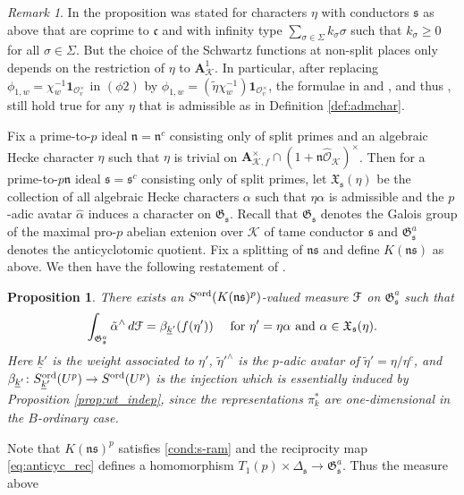 \documentclass[leqno]{amsart}
\newtheorem{prop}[thm]{Proposition}
\theoremstyle{definition}
\theoremstyle{remark}
\newtheorem{rem}[thm]{Remark}
\newcommand{\id}{\mathbf{1}}
\newcommand{\oo}{\mathcal{O}}
\newcommand{\A}{\mathbf A}
\newcommand{\fc}{\mathfrak{c}}
\newcommand{\fn}{\mathfrak{n}}
\newcommand{\fs}{\mathfrak{s}}
\newcommand{\K}{{\mathcal{K}}} %
\newcommand{\fG}{\mathfrak{G}}
\newcommand{\fX}{\mathfrak{X}}
\newcommand{\wt}[1]{\underline{ #1 }}
\newcommand{\euF}{\EuScript{F}} %
\newcommand{\ord}{\textnormal{ord}} %
\begin{document}
\begin{rem}
In \cite{lee}
the proposition was stated 
for characters $\eta$
with conductors $\fs$ as above
that are coprime to $\fc$
and with infinity type
$\sum_{\sigma\in \Sigma}k_\sigma\sigma$
such that $k_\sigma\geq 0$ for all $\sigma\in \Sigma$.
But the choice of the Schwartz functions
at non-split places only depends
on the restriction of $\eta$ to $\A_\K^1$.
In particular, after replacing 
$\phi_{1,w}=\chi_w^{-1}\id_{\oo_v^\times}$
in $(\phi 2)$ \cite[p.14]{lee}
by $\phi_{1,w}=(\tilde{\eta}\chi_w^{-1})\id_{\oo_v^\times}$,
the formulae in
\cite[Prop 4.3]{lee} and \cite[Prop 4.5]{lee},
and thus \cite[Prop 7.5]{lee}, 
still hold true for any $\eta$ that is 
admissible as in Definition \ref{def:admchar}.
\end{rem}

Fix a prime-to-$p$ ideal $\fn=\fn^c$
consisting only of split primes
and an algebraic Hecke character $\eta$
such that $\eta$ is trivial on
$\A_{\K,f}^\times\cap (1+\fn\widehat{\oo}_\K)^\times$.
Then for a prime-to-$p\fn$ ideal $\fs=\fs^c$
consisting only of split primes,
let $\fX_\fs(\eta)$ be the collection of all
algebraic Hecke characters $\alpha$ such that 
$\eta\alpha$ is admissible and
the $p$-adic avatar
$\hat{\alpha}$ induces a character
on $\fG_\fs$.
Recall that 
$\fG_\fs$ denotes the Galois group of the maximal pro-$p$
abelian extenion over $\K$ of tame conductor $\fs$
and $\fG_\fs^a$ denotes the anticyclotomic quotient.
Fix a splitting of $\fn\fs$
and define $K(\fn\fs)$ as above.
We then have the following restatement of
\cite[Thm. 7.6]{lee}.
\begin{prop}\label{prop:family}
    There exists an
    $S^{\ord}(K(\fn\fs)^p)$-valued measure $\euF$
    on $\fG_\fs^a$ such that 
    \[
    \int_{\fG_\fs^a} \tilde{\alpha}^\wedge\,d\euF
    =\beta_{\wt{k}'}(f(\eta'))\quad\text{ for }
    \eta'=\eta\alpha\text{ and }
    \alpha\in \fX_\fs(\eta).
    \]
    Here $\wt{k}'$ is the weight associated
    to $\eta'$,
    $\tilde{\eta}'^\wedge$
    is the $p$-adic avatar
    of $\tilde{\eta}'=\eta/\eta^c$,
    and $\beta_{\wt{k}'}\colon 
    S^{\ord}_{\wt{k}'}(U^p)\to S^{\ord}(U^p)$
    is the injection which is essentially 
    induced by Proposition \ref{prop:wt_indep},
    since the representations $\pi_{\wt{k}}^*$ 
    are one-dimensional in the $B$-ordinary case.
\end{prop}
Note that $K(\fn\fs)^p$ satisfies \eqref{cond:s-ram}
and the reciprocity map
\eqref{eq:anticyc_rec}
defines a homomorphism
$T_1(p)\times \Delta_\fs\to \fG_\fs^a$.
Thus the measure above 
\end{document}
